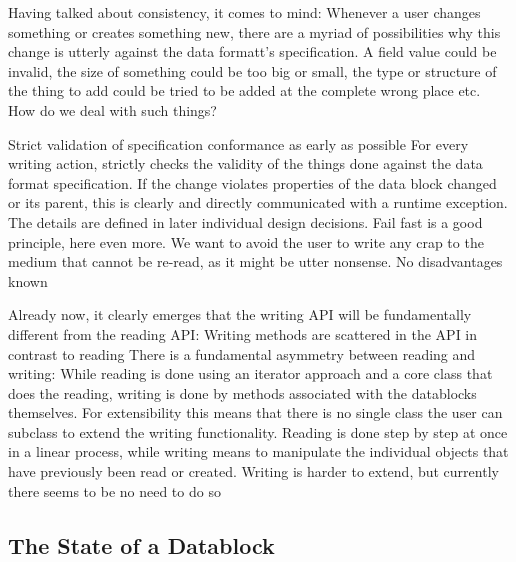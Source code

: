 Having talked about consistency, it comes to mind: Whenever a user changes something or creates something new, there are a myriad of possibilities why this change is utterly against the data formatt's specification. A field value could be invalid, the size of something could be too big or small, the type or structure of the thing to add could be tried to be added at the complete wrong place etc. How do we deal with such things?

{%
Strict validation of specification conformance as early as possible
}
{%
For every writing action, \COMPdataPartManagement{} strictly checks the validity of the things done against the data format specification. If the change violates properties of the data block changed or its parent, this is clearly and directly communicated with a runtime exception. The details are defined in later individual design decisions.
}
{%
Fail fast is a good principle, here even more. We want to avoid the user to write any crap to the medium that cannot be re-read, as it might be utter nonsense.
}
{%
No disadvantages known
}

Already now, it clearly emerges that the writing API will be fundamentally different from the reading API:
{%
Writing methods are scattered in the API in contrast to reading
}
{%
There is a fundamental asymmetry between reading and writing: While reading is done using an iterator approach and a core class that does the reading, writing is done by methods associated with the datablocks themselves. For extensibility this means that there is no single class the user can subclass to extend the writing functionality.
}
{%
Reading is done step by step at once in a linear process, while writing means to manipulate the individual objects that have previously been read or created.
}
{%
Writing is harder to extend, but currently there seems to be no need to do so
}

\subsection{The State of a Datablock}%
\label{sec:StatesofDatablocks}%

